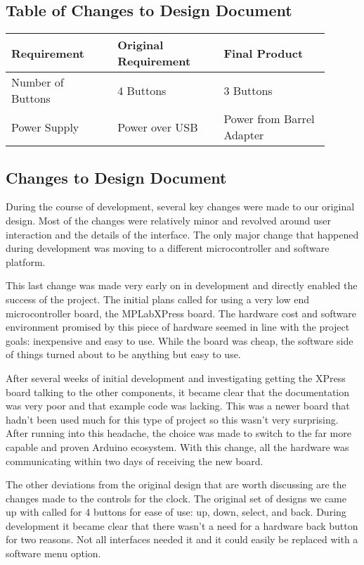 \documentclass[onecolumn, draftclsnofoot,10pt, compsoc]{IEEEtran}
\begin{document}
\subsection{Table of Changes to Design Document}
\begin{center}
\begin{tabular}{| p{0.3\linewidth} | p{0.3\linewidth} | p{0.3\linewidth} |}
\hline
Requirement &
Original Requirement &
Final Product \\
\hline
Number of Buttons &
4 Buttons &
3 Buttons \\
\hline
Power Supply &
Power over USB &
Power from Barrel Adapter \\
\hline

\end{tabular}
\end{center}

\subsection{Changes to Design Document}
During the course of development, several key changes were made to our original design. Most of the changes were relatively minor and revolved around user interaction and the details of the interface. The only major change that happened during development was moving to a different microcontroller and software platform.

This last change was made very early on in development and directly enabled the success of the project. The initial plans called for using a very low end microcontroller board, the MPLabXPress board. The hardware cost and software environment promised by this piece of hardware seemed in line with the project goals: inexpensive and easy to use. While the board was cheap, the software side of things turned about to be anything but easy to use.

After several weeks of initial development and investigating getting the XPress board talking to the other components, it became clear that the documentation was very poor and that example code was lacking. This was a newer board that hadn’t been used much for this type of project so this wasn’t very surprising. After running into this headache, the choice was made to switch to the far more capable and proven Arduino ecosystem. With this change, all the hardware was communicating within two days of receiving the new board.

The other deviations from the original design that are worth discussing are the changes made to the controls for the clock. The original set of designs we came up with called for 4 buttons for ease of use: up, down, select, and back. During development it became clear that there wasn’t a need for a hardware back button for two reasons. Not all interfaces needed it and it could easily be replaced with a software menu option.
\end{document}
